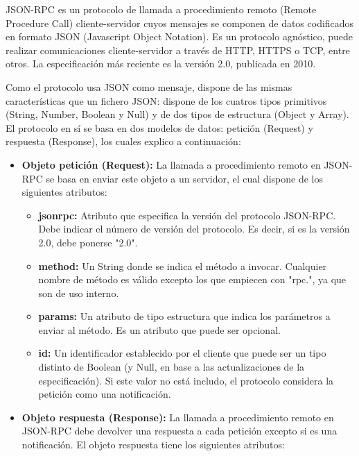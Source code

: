 \documentclass[spanish,12pt, a4paper, twoside]{paper}
\begin{document}
JSON-RPC es un protocolo de llamada a procedimiento remoto (Remote Procedure Call) cliente-servidor cuyos mensajes se componen de datos codificados en formato JSON (Javascript Object Notation). Es un protocolo agnóstico, puede realizar comunicaciones cliente-servidor a través de HTTP, HTTPS o TCP, entre otros. La especificación más reciente es la versión 2.0, publicada en 2010.
\newline

Como el protocolo usa JSON como mensaje, dispone de las mismas características que un fichero JSON: dispone de los cuatros tipos primitivos (String, Number, Boolean y Null) y de dos tipos de estructura (Object y Array).
El protocolo en sí se basa en dos modelos de datos: petición (Request) y respuesta (Response), los cuales explico a continuación:

\begin{itemize}
\item \textbf{Objeto petición (Request):} La llamada a procedimiento remoto en JSON-RPC se basa en enviar este objeto a un servidor, el cual dispone de los siguientes atributos:

\begin{itemize}
\item \textbf{jsonrpc:} Atributo que especifica la versión del protocolo JSON-RPC. Debe indicar el número de versión del protocolo. Es decir, si es la versión 2.0, debe ponerse "2.0".

\item \textbf{method:} Un String donde se indica el método a invocar. Cualquier nombre de método es válido excepto los que empiecen con "rpc.", ya que son de uso interno.

\item \textbf{params:} Un atributo de tipo estructura que indica los parámetros a enviar al método. Es un atributo que puede ser opcional.

\item \textbf{id:} Un identificador establecido por el cliente que puede ser un tipo distinto de Boolean (y Null, en base a las actualizaciones de la especificación). Si este valor no está includo, el protocolo considera la petición como una notificación.
\end{itemize}

\item \textbf{Objeto respuesta (Response):} La llamada a procedimiento remoto en JSON-RPC debe devolver una respuesta a cada petición excepto si es una notificación. El objeto respuesta tiene los siguientes atributos:


\end{itemize}
\end{document}
